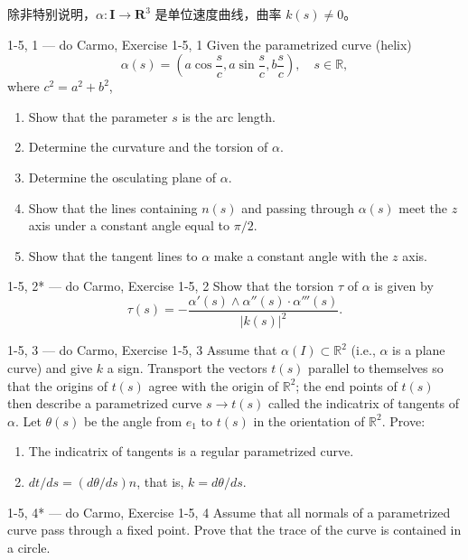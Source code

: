 除非特别说明，$\alpha: \mathbf{I} \to \mathbf{R}^3$ 是单位速度曲线，曲率 $k(s) \neq 0$。

\begin{exercise}{1-5, 1 — do Carmo, Exercise 1-5, 1}
Given the parametrized curve (helix)
\[
\alpha(s) = \left(a\cos\frac{s}{c}, a\sin\frac{s}{c}, b\frac{s}{c}\right), \quad s \in \mathbb{R},
\]
where $c^2 = a^2 + b^2$,
\begin{enumerate}
\item[a.] Show that the parameter $s$ is the arc length.
\item[b.] Determine the curvature and the torsion of $\alpha$.
\item[c.] Determine the osculating plane of $\alpha$.
\item[d.] Show that the lines containing $n(s)$ and passing through $\alpha(s)$ meet the $z$ axis under a constant angle equal to $\pi/2$.
\item[e.] Show that the tangent lines to $\alpha$ make a constant angle with the $z$ axis.
\end{enumerate}
\end{exercise}

\begin{exercise}{1-5, 2* — do Carmo, Exercise 1-5, 2}
Show that the torsion $\tau$ of $\alpha$ is given by
\[
\tau(s) = - \frac{\alpha'(s) \wedge \alpha''(s) \cdot \alpha'''(s)}{|k(s)|^2}.
\]
\end{exercise}

\begin{exercise}{1-5, 3 — do Carmo, Exercise 1-5, 3}
Assume that $\alpha(I) \subset \mathbb{R}^2$ (i.e., $\alpha$ is a plane curve) and give $k$ a sign. Transport the vectors $t(s)$ parallel to themselves so that the origins of $t(s)$ agree with the origin of $\mathbb{R}^2$; the end points of $t(s)$ then describe a parametrized curve $s \to t(s)$ called the indicatrix of tangents of $\alpha$. Let $\theta(s)$ be the angle from $e_1$ to $t(s)$ in the orientation of $\mathbb{R}^2$. Prove:
\begin{enumerate}
\item[a.] The indicatrix of tangents is a regular parametrized curve.
\item[b.] $dt/ds = (d\theta/ds)n$, that is, $k = d\theta/ds$.
\end{enumerate}
\end{exercise}

\begin{exercise}{1-5, 4* — do Carmo, Exercise 1-5, 4}
Assume that all normals of a parametrized curve pass through a fixed point. Prove that the trace of the curve is contained in a circle.
\end{exercise}

